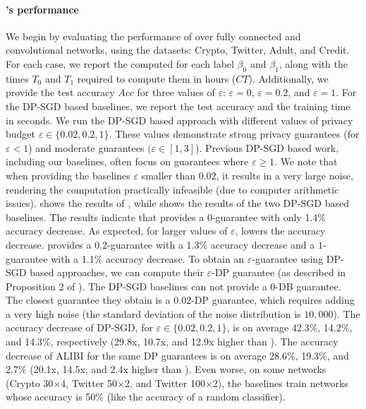 {\paragraph{\tool's performance}
We begin by evaluating the performance of \tool over fully connected and convolutional networks, using the datasets: Crypto, Twitter, Adult, and Credit. 
For each case, we report the computed \propa for each label $\beta_0$ and $\beta_1$, along with the times $T_0$ and $T_1$ required to compute them in hours ($CT$). 
Additionally, we provide the test accuracy $Acc$ for three values of $\varepsilon$: $\varepsilon=0$, $\varepsilon=0.2$, and $\varepsilon=1$. 
For the DP-SGD based baselines, we report the test accuracy and the training time in seconds. 
We run the DP-SGD based approach with different values of privacy budget $\varepsilon \in \{0.02,0.2,1\}$.
These values demonstrate strong privacy guarantees (for $\varepsilon<1$) and moderate guarantees $(\varepsilon \in [1,3]$). 
Previous  DP-SGD based work, including our baselines, often focus on guarantees where $\varepsilon\geq 1$.
We note that when providing the baselines $\varepsilon$ smaller than $0.02$, it results in a very large noise, rendering the computation practically infeasible (due to computer arithmetic issues). 
 shows the results of \tool, while  shows the results of the two DP-SGD based baselines. 
The results indicate that \tool provides a $0$-\propi guarantee with only 1.4\% accuracy decrease. As expected, for larger values of $\varepsilon$, \tool lowers the accuracy decrease. \tool provides a $0.2$-\propi guarantee with a 1.3\% accuracy decrease and a $1$-\propi guarantee with a 1.1\% accuracy decrease.
To obtain an $\varepsilon$-\propi guarantee using DP-SGD based approaches, we can compute their $\varepsilon$-DP guarantee (as described in Proposition 2 of \cite{ref_88}).
The DP-SGD baselines can not provide a $0$-DB guarantee. 
The closest guarantee they obtain is a $0.02$-DP guarantee, which requires adding a very high noise (the standard deviation of the noise distribution is $10,000$). 
The accuracy decrease of DP-SGD, for $\varepsilon\in\{0.02,0.2,1\}$, is on average 42.3\%, 14.2\%, and 14.3\%, respectively (29.8x, 10.7x, and 12.9x higher than \tool). 
The accuracy decrease of ALIBI for the same DP guarantees is on average 28.6\%, 19.3\%, and 2.7\% (20.1x, 14.5x, and 2.4x higher than \tool). 
Even worse, on some networks (Crypto 30$\times$4, Twitter 50$\times$2, and Twitter 100$\times$2), the baselines train networks whose accuracy is 50\% (like the accuracy of a random classifier).  
}
